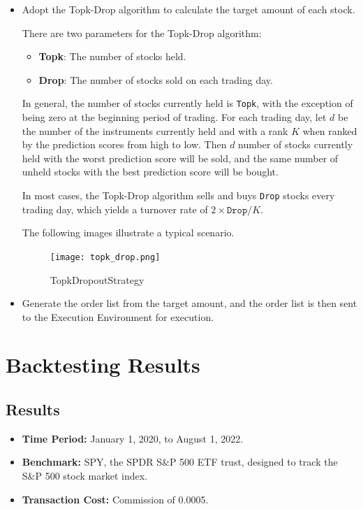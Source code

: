 \documentclass[conference]{IEEEtran}
\begin{document}
\begin{itemize}
    \item Adopt the Topk-Drop algorithm to calculate the target amount of each stock.
    
    There are two parameters for the Topk-Drop algorithm:
    \begin{itemize}
        \item \textbf{Topk}: The number of stocks held.
        \item \textbf{Drop}: The number of stocks sold on each trading day.
    \end{itemize}
    
    In general, the number of stocks currently held is \texttt{Topk}, with the exception of being zero at the beginning period of trading. 
    For each trading day, let $d$ be the number of the instruments currently held and with a rank $K$ when ranked by the prediction scores from high to low. 
    Then $d$ number of stocks currently held with the worst prediction score will be sold, and the same number of unheld stocks with the best prediction score will be bought.
    
    In most cases, the Topk-Drop algorithm sells and buys \texttt{Drop} stocks every trading day, which yields a turnover rate of $2 \times \texttt{Drop} / K$.
    
    The following images illustrate a typical scenario.

    \begin{figure}[htbp]
        \centering
        \texttt{[image: topk\_drop.png]}
        \caption{TopkDropoutStrategy}
        \label{fig:TopkDropoutStrategy}
    \end{figure}

    \item Generate the order list from the target amount, and the order list is then sent to the Execution Environment for execution.
\end{itemize}

\section{\textbf{Backtesting Results}}

\subsection{\textbf{Results}}

\begin{itemize}
    \item \textbf{Time Period:} January 1, 2020, to August 1, 2022.
    \item \textbf{Benchmark:} SPY, the SPDR S\&P 500 ETF trust, designed to track the S\&P 500 stock market index.
    \item \textbf{Transaction Cost:} Commission of 0.0005.
\end{itemize}
\end{document}
